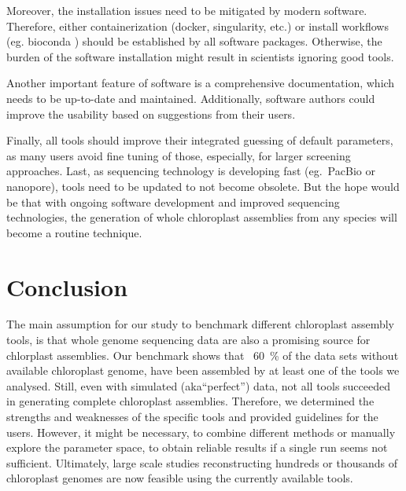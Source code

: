 \documentclass{bmcart}
\begin{document}
Moreover, the installation issues need to be mitigated by modern software.
Therefore, either containerization (docker, singularity, etc.) or install workflows (eg. bioconda \cite{gruening2018}) should be established by all software packages.
Otherwise, the burden of the software installation might result in scientists ignoring good tools.

Another important feature of software is a comprehensive documentation, which needs to be up-to-date and maintained.
Additionally, software authors could improve the usability based on suggestions from their users.

Finally, all tools should improve their integrated guessing of default parameters, as many users avoid fine tuning of those, especially, for larger screening approaches.
Last, as sequencing technology is developing fast (eg.\ PacBio or nanopore), tools need to be updated to not become obsolete.
But the hope would be that with ongoing software development and improved sequencing technologies, the generation of whole chloroplast assemblies from any species will become a routine technique.

\section*{Conclusion}
The main assumption for our study to benchmark different chloroplast assembly tools, is that whole genome sequencing data are also a promising source for chlorplast assemblies.
Our benchmark shows that ~\SI{60}{\percent} of the data sets without available chloroplast genome, have been assembled by at least one of the tools we analysed.
Still, even with simulated (aka``perfect'') data, not all tools succeeded in generating complete chloroplast assemblies.
Therefore, we determined the strengths and weaknesses of the specific tools and provided guidelines for the users.
However, it might be necessary, to combine different methods or manually explore the parameter space, to obtain reliable results if a single run seems not sufficient.
Ultimately, large scale studies reconstructing hundreds or thousands of chloroplast genomes are now feasible using the currently available tools. 
\end{document}
